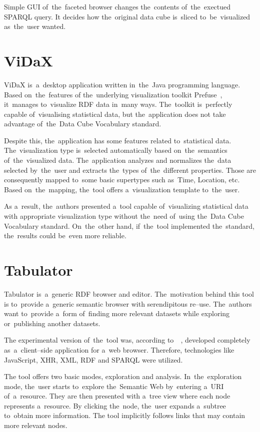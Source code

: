 Simple GUI of~the~faceted browser changes the~contents of~the~exectued SPARQL query. 
It decides how the~original data cube is~sliced to~be~visualized as~the~user 
wanted.

\section{ViDaX}
ViDaX is~a~desktop application written in~the~Java programming language. Based on~the~features
of the~underlying visualization toolkit Prefuse~\cite{prefuse}, it~manages to~visualize RDF data in~many ways. The~toolkit is~perfectly capable of~visualising statistical data, but the~application does not take advantage of~the~Data Cube Vocabulary standard.

Despite this, the~application has some features related to~statistical 
data. The~visualization type is~selected automatically based on~the~semantics of~the~visualized data. The~application analyzes and normalizes the~data selected by~the~user 
and extracts the~types of~the~different properties. Those are consequently mapped to~some basic supertypes such as~Time, Location, etc. Based on~the~mapping,
the~tool offers a~visualization template to~the~user.

As a~result, the~authors presented a~tool capable of~visualizing 
statistical data with appropriate visualization type without the~need of~using 
the~Data Cube Vocabulary standard. On~the~other hand, if~the~tool 
implemented the~standard, the~results could be~even more reliable.

\section{Tabulator}
\label{sec:rw:tabulator}
Tabulator is~a~generic RDF browser and editor. The~motivation behind this tool
is to~provide a~generic semantic browser with serendipitous re--use. The~authors 
want to~provide a~form of~finding more relevant datasets while exploring or~publishing another datasets. 

The experimental version of~the~tool was, according to~~\cite{tabulator-paper}, 
developed completely as~a~client--side application for a~web browser. Therefore, 
technologies like JavaScript, XHR, XML, RDF and SPARQL were utilized.

The tool offers two basic modes, exploration and analysis. In~the~exploration mode,
the~user starts to~explore the~Semantic Web by~entering a~URI of~a~resource. They 
are then presented with a~tree view where each node represents a~resource. 
By clicking the~node, the~user expands a~subtree to~obtain more information.
The tool implicitly follows links that may contain more relevant nodes.

